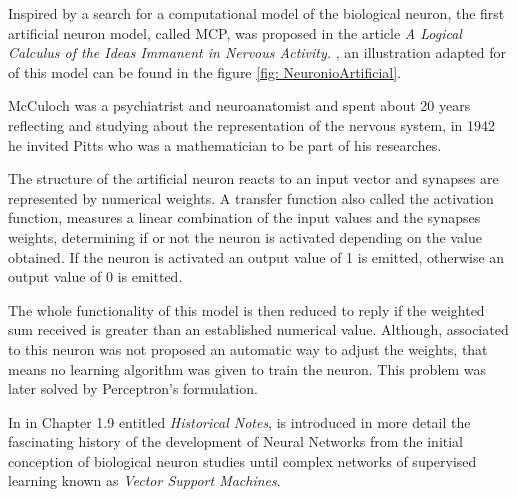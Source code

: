         Inspired by a search for a computational model of the biological neuron, the first artificial neuron model, called MCP, was proposed in the article \textit{ A Logical Calculus of the Ideas Immanent in Nervous Activity.} \cite{mcculloch43a}, an illustration adapted for \cite{lemos} of this model can be found in the figure \ref{fig: NeuronioArtificial}.
        
        McCuloch was a psychiatrist and neuroanatomist and spent about 20 years reflecting and studying about the representation of the nervous system, in 1942 he invited Pitts who was a mathematician to be part of his researches.
        
        The structure of the artificial neuron reacts to an input vector and synapses are represented by numerical weights. A transfer function also called the activation function, measures a linear combination of the input values and the synapses weights, determining if or not the neuron is activated depending on the value obtained. If the neuron is activated an output value of 1 is emitted, otherwise an output value of 0 is emitted.
            \begin{figure}[ht]
            \end{figure}
            
        The whole functionality of this model is then reduced to reply if the weighted sum received is greater than an established numerical value. Although, associated to this neuron was not proposed an automatic way to adjust the weights, that means no learning algorithm was given to train the neuron. This problem was later solved by Perceptron's formulation.
        
        In  in Chapter 1.9 entitled \textit{Historical Notes}, is introduced in more detail the fascinating history of the development of Neural Networks from the initial conception of biological neuron studies until complex networks of supervised learning known as \textit{Vector Support Machines}.
            
